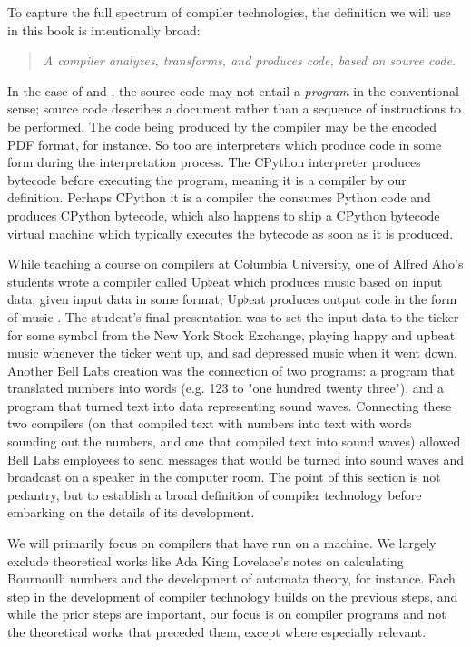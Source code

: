 \vspace{0.5em}

To capture the full spectrum of compiler technologies,
the definition we will use in this book is intentionally broad:
\begin{quotation}
\textit{
    A compiler analyzes, transforms, and produces code, based on source code.
}
\label{def:compiler}
\end{quotation}

In the case of \tex and \metafont, the source code
may not entail a \textit{program} in the conventional sense;
\tex source code describes a document rather than a sequence of
instructions to be performed.
The code being produced by the compiler may be the encoded PDF format, for instance.
So too are interpreters which produce code in some form during the interpretation process.
The CPython interpreter produces bytecode before executing the program,
meaning it is a compiler by our definition.
Perhaps CPython it is a compiler the consumes Python code and produces CPython bytecode,
which also happens to ship a CPython bytecode virtual machine which typically
executes the bytecode as soon as it is produced.

While teaching a course on compilers at Columbia University, one of Alfred Aho's students
wrote a compiler called Up$\flat$eat which produces music based on input data;
given input data in some format, Up$\flat$eat produces output code in the form of music
\cite{aho_oral_history_2022}.
The student's final presentation was to set the input data to the ticker for some symbol
from the New York Stock Exchange, playing happy and upbeat music whenever the ticker went up,
and sad depressed music when it went down.
Another Bell Labs creation was the connection of two programs: a program that translated
numbers into words (e.g. 123 to "one hundred twenty three"), and a program that turned
text into data representing sound waves.
Connecting these two compilers (on that compiled text with numbers into text with words
sounding out the numbers, and one that compiled text into sound waves) allowed
Bell Labs employees to send messages that would be turned into sound waves and broadcast
on a speaker in the computer room.
The point of this section is not pedantry, but to establish a broad definition of
compiler technology before embarking on the details of its development.

We will primarily focus on compilers that have run on a machine.
We largely exclude theoretical works like Ada King Lovelace's notes on calculating Bournoulli numbers
and the development of automata theory, for instance.
Each step in the development of compiler technology builds on the previous steps,
and while the prior steps are important, our focus is on compiler programs and not the
theoretical works that preceded them, except where especially relevant.
